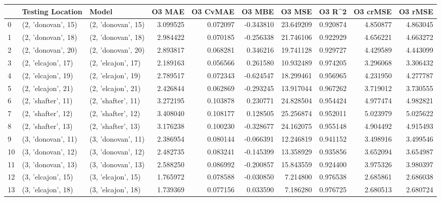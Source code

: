 \begin{tabular}{lllrrrrrrr}
\toprule
{} &    Testing Location &               Model &    O3 MAE &  O3 CvMAE &    O3 MBE &     O3 MSE &    O3 R\textasciicircum2 &  O3 crMSE &   O3 rMSE \\
\midrule
0  &  (2, 'donovan', 15) &  (2, 'donovan', 15) &  3.099525 &  0.072097 & -0.343810 &  23.649209 &  0.920874 &  4.850877 &  4.863045 \\
1  &  (2, 'donovan', 18) &  (2, 'donovan', 18) &  2.984422 &  0.070185 & -0.256338 &  21.746106 &  0.922929 &  4.656221 &  4.663272 \\
2  &  (2, 'donovan', 20) &  (2, 'donovan', 20) &  2.893817 &  0.068281 &  0.346216 &  19.741128 &  0.929727 &  4.429589 &  4.443099 \\
3  &  (2, 'elcajon', 17) &  (2, 'elcajon', 17) &  2.189163 &  0.056566 &  0.261580 &  10.932489 &  0.974205 &  3.296068 &  3.306432 \\
4  &  (2, 'elcajon', 19) &  (2, 'elcajon', 19) &  2.789517 &  0.072343 & -0.624547 &  18.299461 &  0.956965 &  4.231950 &  4.277787 \\
5  &  (2, 'elcajon', 21) &  (2, 'elcajon', 21) &  2.426844 &  0.062869 & -0.293245 &  13.917044 &  0.967262 &  3.719012 &  3.730555 \\
6  &  (2, 'shafter', 11) &  (2, 'shafter', 11) &  3.272195 &  0.103878 &  0.230771 &  24.828504 &  0.954424 &  4.977474 &  4.982821 \\
7  &  (2, 'shafter', 12) &  (2, 'shafter', 12) &  3.408040 &  0.108177 &  0.128505 &  25.256874 &  0.952011 &  5.023979 &  5.025622 \\
8  &  (2, 'shafter', 13) &  (2, 'shafter', 13) &  3.176238 &  0.100230 & -0.328677 &  24.162075 &  0.955148 &  4.904492 &  4.915493 \\
9  &  (3, 'donovan', 11) &  (3, 'donovan', 11) &  2.386954 &  0.080144 & -0.066391 &  12.246819 &  0.941152 &  3.498916 &  3.499546 \\
10 &  (3, 'donovan', 12) &  (3, 'donovan', 12) &  2.482735 &  0.083241 & -0.145399 &  13.358929 &  0.935856 &  3.652094 &  3.654987 \\
11 &  (3, 'donovan', 13) &  (3, 'donovan', 13) &  2.588250 &  0.086992 & -0.200857 &  15.843559 &  0.924400 &  3.975326 &  3.980397 \\
12 &  (3, 'elcajon', 15) &  (3, 'elcajon', 15) &  1.765972 &  0.078588 & -0.030850 &   7.214800 &  0.976538 &  2.685861 &  2.686038 \\
13 &  (3, 'elcajon', 18) &  (3, 'elcajon', 18) &  1.739369 &  0.077156 &  0.033590 &   7.186280 &  0.976725 &  2.680513 &  2.680724 \\

\end{tabular}
